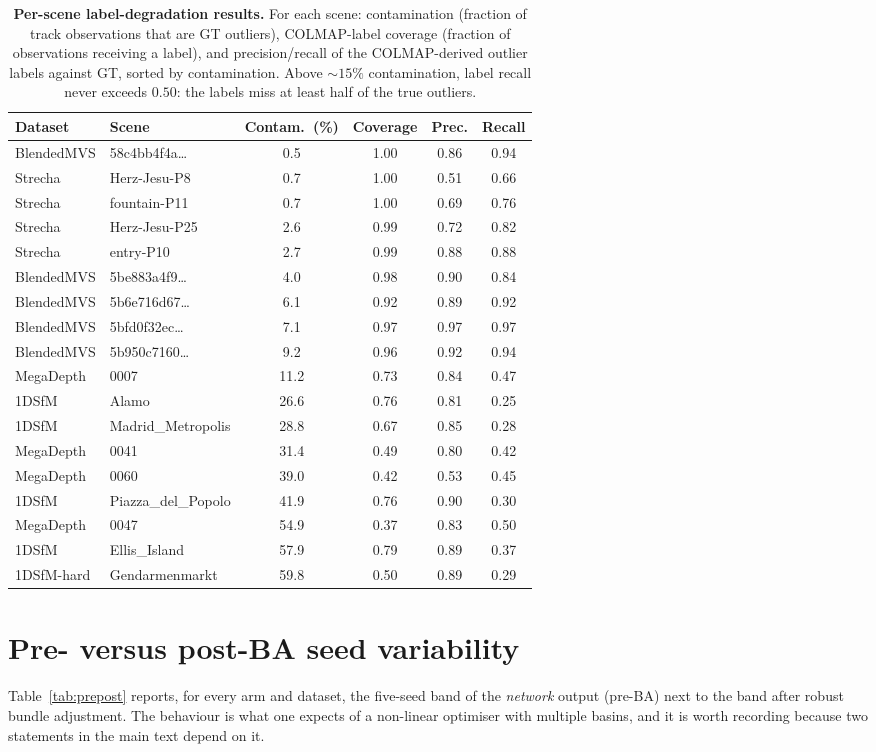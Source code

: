 \documentclass{article}
\begin{document}
\begin{table}[t]\centering\footnotesize
\caption{\textbf{Per-scene label-degradation results.} For each scene: contamination (fraction of track observations that are GT outliers), COLMAP-label coverage (fraction of observations receiving a label), and precision/recall of the COLMAP-derived outlier labels against GT, sorted by contamination. Above ${\sim}15\%$ contamination, label recall never exceeds $0.50$: the labels miss at least half of the true outliers.}
\label{tab:supp_labelceiling}
\setlength{\tabcolsep}{3.5pt}%
\begin{tabular}{llcccc}
\toprule
Dataset & Scene & Contam.\ (\%) & Coverage & Prec. & Recall\\
\midrule
BlendedMVS & 58c4bb4f4a\ldots & 0.5 & 1.00 & 0.86 & 0.94\\
Strecha & Herz-Jesu-P8 & 0.7 & 1.00 & 0.51 & 0.66\\
Strecha & fountain-P11 & 0.7 & 1.00 & 0.69 & 0.76\\
Strecha & Herz-Jesu-P25 & 2.6 & 0.99 & 0.72 & 0.82\\
Strecha & entry-P10 & 2.7 & 0.99 & 0.88 & 0.88\\
BlendedMVS & 5be883a4f9\ldots & 4.0 & 0.98 & 0.90 & 0.84\\
BlendedMVS & 5b6e716d67\ldots & 6.1 & 0.92 & 0.89 & 0.92\\
BlendedMVS & 5bfd0f32ec\ldots & 7.1 & 0.97 & 0.97 & 0.97\\
BlendedMVS & 5b950c7160\ldots & 9.2 & 0.96 & 0.92 & 0.94\\
MegaDepth & 0007 & 11.2 & 0.73 & 0.84 & 0.47\\
1DSfM & Alamo & 26.6 & 0.76 & 0.81 & 0.25\\
1DSfM & Madrid\_Metropolis & 28.8 & 0.67 & 0.85 & 0.28\\
MegaDepth & 0041 & 31.4 & 0.49 & 0.80 & 0.42\\
MegaDepth & 0060 & 39.0 & 0.42 & 0.53 & 0.45\\
1DSfM & Piazza\_del\_Popolo & 41.9 & 0.76 & 0.90 & 0.30\\
MegaDepth & 0047 & 54.9 & 0.37 & 0.83 & 0.50\\
1DSfM & Ellis\_Island & 57.9 & 0.79 & 0.89 & 0.37\\
1DSfM-hard & Gendarmenmarkt & 59.8 & 0.50 & 0.89 & 0.29\\
\bottomrule
\end{tabular}
\end{table}


\section{Pre- versus post-BA seed variability}\label{app:prepost}
Table~\ref{tab:prepost} reports, for every arm and dataset, the five-seed band of the
\emph{network} output (pre-BA) next to the band after robust bundle adjustment. The
behaviour is what one expects of a non-linear optimiser with multiple basins, and it is
worth recording because two statements in the main text depend on it.
\end{document}
